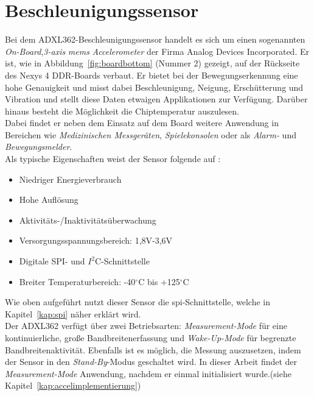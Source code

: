 \section{Beschleunigungssensor\label{kap:accelerometer}}

Bei dem ADXL362-Beschleunigungssensor handelt es sich um einen
sogenannten \emph{On-Board},\emph{3-axis} \emph{\ac{mems}} \emph{Accelerometer}
der Firma Analog Devices Incorporated. Er ist, wie in Abbildung~\ref{fig:boardbottom} (Nummer 2) gezeigt, auf der
Rückseite des Nexys 4 DDR-Boards verbaut. Er bietet bei der Bewegungserkennung eine hohe Genauigkeit und misst dabei
Beschleunigung, Neigung, Erschütterung und Vibration und stellt diese Daten etwaigen Applikationen zur
Verfügung. Darüber hinaus besteht die Möglichkeit die Chiptemperatur auszulesen.\\
Dabei findet er neben dem Einsatz auf dem Board weitere Anwendung in Bereichen wie \emph{Medizinischen Messgeräten},
\emph{Spielekonsolen} oder als \emph{Alarm-} und \emph{Bewegungsmelder}.\cite{mouser}\\
Als typische Eigenschaften weist der Sensor folgende auf :\cite{accelerometer}\\
\begin{itemize}
  \item Niedriger Energieverbrauch
  \item Hohe Auflösung
  \item Aktivitäts-/Inaktivitätsüberwachung
  \item Versorgungsspannungsbereich: 1,8V-3,6V
  \item Digitale SPI- und \(I^2\)C-Schnittstelle
  \item Breiter Temperaturbereich: -40\(^\circ\)C bis +125\(^\circ\)C
\end{itemize}

Wie oben aufgeführt nutzt dieser Sensor die \ac{spi}-Schnittstelle, welche in Kapitel~\ref{kap:spi} näher
erklärt wird.\\

Der ADXL362 verfügt über zwei Betriebsarten: \emph{Measurement-Mode} für eine kontinuierliche,
 große Bandbreitenerfassung und \emph{Wake-Up-Mode} für begrenzte Bandbreitenaktivität. Ebenfalls ist es möglich,
 die Messung auszusetzen, indem der Sensor in den \emph{Stand-By}-Modus geschaltet wird. In dieser Arbeit findet
 der \emph{Measurement-Mode} Anwendung, nachdem er einmal initialisiert wurde.(siehe Kapitel~\ref{kap:accelimplementierung})\\

